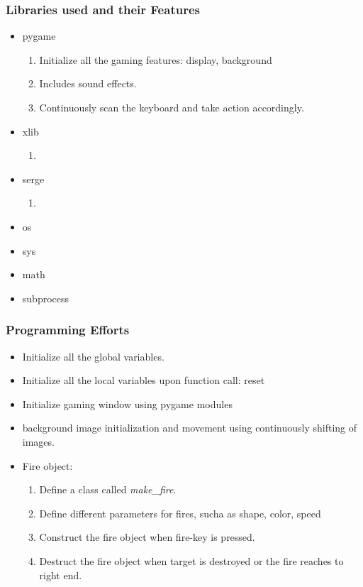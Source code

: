 \documentclass[]{beamer}
\begin{document}
\begin{frame}
  \frametitle{Libraries used and their Features}
  \begin {itemize}
   \item pygame
   \begin {enumerate}
    \item Initialize all the gaming features: display, background
    \item Includes sound effects.
    \item Continuously scan the keyboard and take action accordingly.
    
   \end {enumerate}
   \item xlib
   \begin {enumerate}
    \item 
   \end {enumerate}
   \item serge
   \begin {enumerate}
    \item 
   \end {enumerate}
    \item os
    \item sys
    \item math
    \item subprocess
  \end {itemize}


  \end{frame}


\begin{frame}
  \frametitle{Programming Efforts}
  \begin {itemize}
   \item Initialize all the global variables.
   \item Initialize all the local variables upon function call: reset
   \item Initialize gaming window using pygame modules
   \item background image initialization and movement using 
    continuously shifting of images.
   \item Fire object:
   \begin {enumerate}
    \item Define a class called \textit{make\_fire}. %
    \item Define different parameters for fires, sucha as shape, color, speed
    \item Construct the fire object when fire-key is pressed.
    \item Destruct the fire object when target is destroyed or the fire reaches to right end.
   \end {enumerate}
    
   \end {itemize}


  \end{frame}
\end{document}
